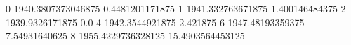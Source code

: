 0 1940.3807373046875 0.4481201171875
1 1941.332763671875 1.400146484375
2 1939.9326171875 0.0
4 1942.3544921875 2.421875
6 1947.48193359375 7.54931640625
8 1955.4229736328125 15.4903564453125
